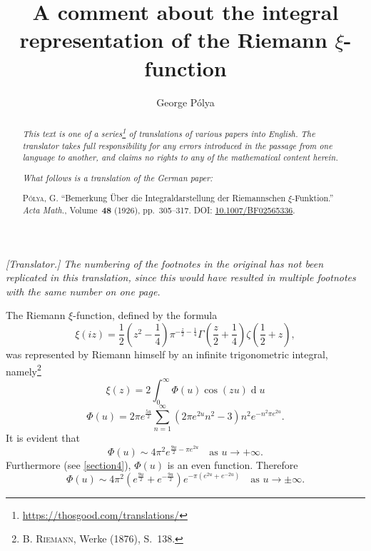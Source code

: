 \documentclass{article}
\title{A comment about the integral representation of the Riemann $\xi$-function}
\author{George P\'{o}lya}
\date{}
\newcommand{\dd}{\operatorname{d}\!}
\newcommand{\oldpage}[1]{\marginpar{\phantom{.}\\\footnotesize$\Big\vert$ \textit{p.~#1}}}
\begin{document}
\maketitle
\thispagestyle{fancy}

\renewcommand{\abstractname}{Translator's note.}

\begin{abstract}
  \renewcommand*{\thefootnote}{\fnsymbol{footnote}}
  \emph{This text is one of a series\footnote{\url{https://thosgood.com/translations/}} of translations of various papers into English.}
  \emph{The translator takes full responsibility for any errors introduced in the passage from one language to another, and claims no rights to any of the mathematical content herein.}
  
  \emph{What follows is a translation of the German paper:}

  \medskip\noindent
  \textsc{P\'{o}lya, G.}
  ``Bemerkung \"{U}ber die Integraldarstellung der Riemannschen $\xi$-Funktion.''
  \emph{Acta Math.}, Volume~\textbf{48} (1926), pp.~305--317.
  \textsc{DOI:} \href{https://doi.org/10.1007/BF02565336}{10.1007/BF02565336}.
\end{abstract}

\setcounter{footnote}{0}

\bigskip



\emph{[Translator.] The numbering of the footnotes in the original has not been replicated in this translation, since this would have resulted in multiple footnotes with the same number on one page.}

\bigskip

The Riemann $\xi$-function, defined by the formula
\oldpage{305}
\[
\label{1}
  \xi(iz)
  =
  \frac12 \left(
    z^2 - \frac14
  \right) \pi^{-\frac{z}{2}-\frac14} \Gamma \left(
    \frac{z}{2} + \frac14
  \right) \zeta \left(
    \frac12 + z
  \right),
\tag{1}
\]
was represented by Riemann himself by an infinite trigonometric integral, namely\footnote{\textsc{B. Riemann}, Werke (1876), S.~138.}
\[
\label{2}
  \xi(z) = 2\int_0^\infty \Phi(u)\cos(zu)\dd u
\tag{2}
\]
\[
\label{3}
  \Phi(u) = 2\pi e^{\frac{5u}{2}} \sum_{n=1}^\infty (2\pi e^{2u}n^2 - 3) n^2 e^{-n^2\pi e^{2u}}.
\tag{3}
\]
It is evident that
\[
\label{4}
  \Phi(u) \sim 4\pi^2 e^{\frac{9u}{2}-\pi e^{2u}}
  \quad\mbox{as $u\to+\infty$.}
\tag{4}
\]
Furthermore (see \cref{section4}), $\Phi(u)$ is an even function.
Therefore
\[
\label{5}
  \Phi(u) \sim 4\pi^2 \left(
    e^{\frac{9u}{2}} + e^{-\frac{9u}{2}}
  \right) e^{-\pi(e^{2u}+e^{-2u})}
  \quad\mbox{as $u\to\pm\infty$.}
\tag{5}
\]
\end{document}
